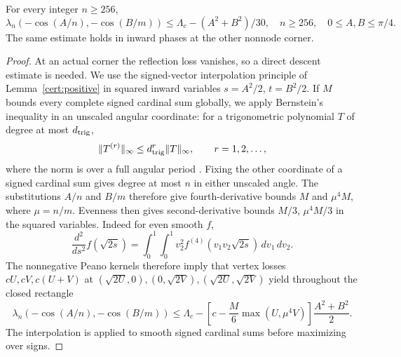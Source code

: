 \begin{lemma}\label{ul:corner-lemma}
For every integer $n\geq256$,
\begin{equation}\label{ul:corner256}
 \lambda_n(-\cos(A/n),-\cos(B/m))
 \leq\Lambda_c-(A^2+B^2)/30,
 \quad n\geq256,\quad 0\leq A,B\leq\pi/4.
\end{equation}
The same estimate holds in inward phases at the other nonnode corner.
\end{lemma}
\begin{proof}


At an actual corner the reflection loss vanishes, so a direct descent
estimate is needed.  We use the signed-vector interpolation principle
of Lemma~\ref{cert:positive} in squared inward variables
$s=A^2/2$, $t=B^2/2$.  If $M$ bounds every complete signed cardinal
sum globally, we apply Bernstein's inequality in an unscaled angular
coordinate: for a trigonometric polynomial $T$ of degree at most $d_{\rm trig}$,
\[
 \|T^{(r)}\|_\infty\leq d_{\rm trig}^r\|T\|_\infty,\qquad r=1,2,\ldots,
\]
where the norm is over a full angular period \cite{Boas1954}.
Fixing the other coordinate of a signed cardinal sum gives degree
at most $n$ in either unscaled angle. The substitutions $A/n$ and
$B/m$ therefore give fourth-derivative bounds $M$ and $\mu^4M$,
where $\mu=n/m$. Evenness then gives second-derivative bounds
$M/3$, $\mu^4M/3$ in the squared variables.
Indeed for even smooth $f$,
\[
 \frac{d^2}{ds^2}f(\sqrt{2s})
   =\int_0^1\!\int_0^1v_2^2f^{(4)}(v_1v_2\sqrt{2s})\,dv_1\,dv_2.
\]
The nonnegative Peano kernels therefore imply that vertex losses
$cU,cV,c(U+V)$ at $(\sqrt{2U},0),(0,\sqrt{2V}),
(\sqrt{2U},\sqrt{2V})$ yield throughout the closed rectangle
\begin{equation}\label{ul:squared-peano}
 \lambda_n(-\cos(A/n),-\cos(B/m))
 \leq\Lambda_c-
 \left[c-\frac M6\max(U,\mu^4V)\right]\frac{A^2+B^2}{2}.
\end{equation}
The interpolation is applied to smooth signed cardinal sums before
maximizing over signs.


\end{proof}
